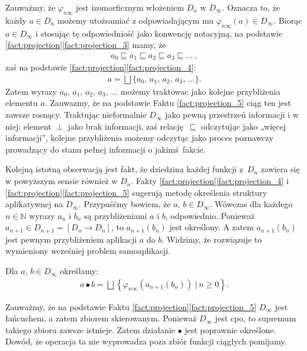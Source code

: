 Zauważmy, że \(\varphi_{n\infty}\) jest izomorficznym włożeniem \(D_n\) w \(D_\infty\). Oznacza to, że każdy \(a\in D_n\) możemy utożsamiać z odpowiadającym mu \(\varphi_{n\infty}(a)\in D_\infty\). Biorąc \(a\in D_\infty\) i stosując tę odpowiedniość jako konwencję notacyjną, na podstawie \ref{fact:projection}\ref{fact:projection_3} mamy, że
\begin{align*}
 a_0 \sqsubseteq  a_1 \sqsubseteq a_2 \sqsubseteq a_3 \sqsubseteq \dots\,,
\end{align*}
zaś na podstawie \ref{fact:projection}\ref{fact:projection_4}:
\begin{align*}
  a=\bigsqcup\{a_0,\,a_1,\,a_2,\,a_3,\,\dots\}.
\end{align*}
Zatem wyrazy \(a_0,\,a_1,\,a_2,\,a_3,\,\dots\) możemy traktowac jako kolejne przybliżenia elementu \(a\). Zauwazmy, że na podstawie Faktu \ref{fact:projection_5} ciąg ten jest zawsze rosnący. Traktując nieformalnie \(D_\infty\) jako pewną przestrzeń informacji i w niej: element \(\perp\) jako brak informacji, zaś relację \(\sqsubseteq\) odczytując jako „więcej informacji”, kolejne przybliżenia możemy odczytąc jako proces poznawczy prowadzący do stanu pełnej informacji o jakimś fakcie.  

Kolejną istotną obserwacją jest fakt, że dziedzina każdej funkcji z~\(D_n\) zawiera się w powyższym sensie również w \(D_n\). Fakty \ref{fact:projection}\ref{fact:projection_4} i \ref{fact:projection}\ref{fact:projection_5} sugerują metodę określenia struktury aplikatywnej na \(D_\infty\). Przypuśćmy bowiem, że \(a,\,b\in D_\infty\). Wówczas dla każdego \(n\in\mathbb{N}\) wyrazy \(a_n\) i \(b_n\) są przybliżeniami \(a\) i \(b\), odpowiednio. Ponieważ \(a_{n+1}\in  D_{n+1}=[D_n\to D_n]\), to \(a_{n+1}(b_n)\) jest określony. A zatem \(a_{n+1}(b_n)\) jest pewnym przybliżeniem aplikacji \(a\) do \(b\). Widzimy, że rozwiązuje to wymieniony wcześniej problem samoaplikacji. 

\begin{definicja}%
  Dla \(a,\,b\in D_\infty\) określamy:
\begin{align*}
a \bullet b = \bigsqcup\left\{\varphi_{n\infty}(a_{n+1}(b_n))\ |\ n\geq 0\right\}.%
\end{align*}
\end{definicja}

Zauważmy, że na podstawie Faktu \ref{fact:projection}\ref{fact:projection_5} \(D_\infty\) jest łańcuchem, a zatem zbiorem skierowanym. Ponieważ \(D_\infty\) jest cpo, to supremum takiego zbioru zawsze istnieje. Zatem działanie \(\bullet\) jest poprawnie określone.
Dowód, że operacja ta nie wyprowadza poza zbiór funkcji ciągłych pomijamy. 

